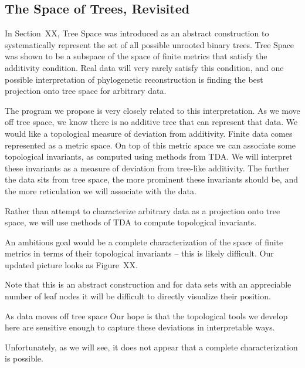 \subsection{The Space of Trees, Revisited}
\label{bg:top4bio:tree_space}

In Section~XX, Tree Space was introduced as an abstract construction to systematically represent the set of all possible unrooted binary trees.
Tree Space was shown to be a subspace of the space of finite metrics that satisfy the additivity condition.
Real data will very rarely satisfy this condition, and one possible interpretation of phylogenetic reconstruction is finding the best projection onto tree space for arbitrary data.


The program we propose is very closely related to this interpretation.
As we move off tree space, we know there is no additive tree that can represent that data.
We would like a topological measure of deviation from additivity.
Finite data comes represented as a metric space.
On top of this metric space we can associate some topological invariants, as computed using methods from TDA.
We will interpret these invariants as a measure of deviation from tree-like additivity.
The further the data sits from tree space, the more prominent these invariants should be, and the more reticulation we will associate with the data.

Rather than attempt to characterize arbitrary data as a projection onto tree space, we will use methods of TDA to compute topological invariants.

An ambitious goal would be a complete characterization of the space of finite metrics in terms of their topological invariants -- this is likely difficult.
Our updated picture looks as Figure~XX.

Note that this is an abstract construction and for data sets with an appreciable number of leaf nodes it will be difficult to directly visualize their position.

As data moves off tree space
Our hope is that the topological tools we develop here are sensitive enough to capture these deviations in interpretable ways.

Unfortunately, as we will see, it does not appear that a complete characterization is possible.